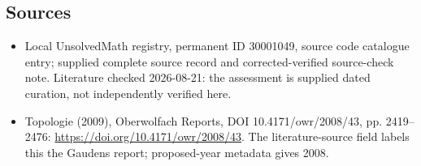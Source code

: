 \documentclass[11pt]{article}
\begin{document}
\subsection{Sources}
\begin{itemize}
\item Local UnsolvedMath registry, permanent ID 30001049, source code catalogue entry; supplied complete source record and corrected-verified source-check note. Literature checked 2026-08-21: the assessment is supplied dated curation, not independently verified here.
\item Topologie (2009), Oberwolfach Reports, DOI 10.4171/owr/2008/43, pp. 2419--2476: \url{https://doi.org/10.4171/owr/2008/43}. The literature-source field labels this the Gaudens report; proposed-year metadata gives 2008.
\end{itemize}
\end{document}
